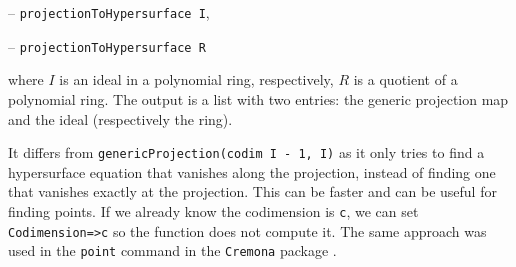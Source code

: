 \documentclass[11pt]{amsart}
\theoremstyle{definition}
\begin{document}
\vspace{0.5em}
-- {\tt projectionToHypersurface I},

-- {\tt projectionToHypersurface R} 
\vspace{0.5em}

\noindent where $I$ is an ideal in a polynomial ring, respectively, $R$ is a quotient of a polynomial ring. The output is
a list with two entries: the generic projection map and the ideal (respectively the ring).

It differs from {\tt genericProjection(codim I - 1, I)} as it only tries to find a hypersurface equation that vanishes along the projection, instead of finding one that vanishes exactly at the projection.  This can be faster and can be useful for finding points.   If we already know the codimension is {\tt c}, we can set {\tt Codimension=>c} so the function does not compute it.  The same approach was used in the {\tt point} command in the {\tt Cremona} package \cite{CremonaSource}.

\begin{comment}~~

  ~~
  
  {{\small\color{blue}
\begin{verbatim}
	i2 : R = ZZ/5[x, y, z];
	
	i3 : I = ideal(random(3, R) - 2, random(2, R));
	
	o3 : Ideal of R
	
	i4 : projectionToHypersurface(I)
	
	            ZZ                             4    3      2 2     4
	o4 = (map(R,--[y, z],{x + 2y, 2y}), ideal(y  + y z - 2y z  - 2z  - y - z))
	            5
	
    o4 : Sequence
	i5 : projectionToHypersurface(R/I)
	
	
	
                           	                    R                    
	o5 = (map(--------------------------------------------------------------
	    3       2     3            2        2       2       2     
	(- x  - 2x*y  - 2y  - x*y*z + y z - 2x*z  + 2y*z  - 2, x  - 2x
	-------------------------------------------------------------------
                                    ZZ                       
	                                    --[y, z]                 
	                                    5                       
	--------------------,----------------------------------------------
	      2               4 2    3 3       5     6     3       2     3 
	*y - y  + x*z - y*z) y z  + y z  - 2y*z  + 2z  + 2y  + 2y*z  + 2z  
	-------------------------------------------------------------------
                    	       ZZ
                	           --[y, z]
	                            5
	---,{x - z, y}), -------------------------------------------------)
	                  4 2    3 3       5     6     3       2     3
	- 1              y z  + y z  - 2y*z  + 2z  + 2y  + 2y*z  + 2z  - 1
	
	o5 : Sequence
	\end{verbatim}
    }}
\end{comment}
\end{document}
